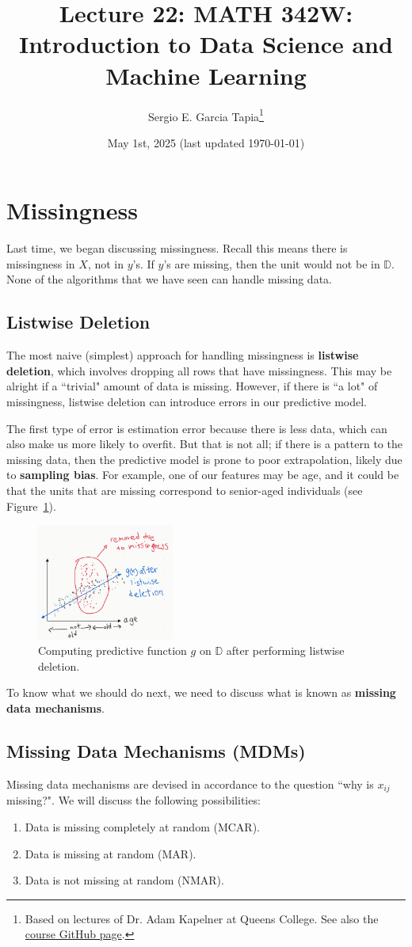 \documentclass[12pt, a4paper]{article}
\title{Lecture 22: MATH 342W: Introduction to Data Science and Machine Learning}
\author{Sergio E. Garcia Tapia\thanks{Based on lectures of Dr. Adam Kapelner at Queens College.
See also the \href{https://github.com/kapelner/QC_MATH_342W_Spring_2025}{course GitHub page}.}}
\date{May 1st, 2025 (last updated \today)}
\theoremstyle{definition}
\begin{document}
	\maketitle
	\section{Missingness}
	Last time, we began discussing missingness. Recall this means there is
	missingness in $X$, not in $y$'s. If $y$'s are missing, then the unit would
	not be in $\mathbb{D}$. None of the algorithms that we have seen can handle
	missing data.
	
	\subsection{Listwise Deletion}
	The most naive (simplest) approach for handling missingness is \textbf{listwise deletion},
	which involves dropping all rows that have missingness. This may be alright if
	a ``trivial" amount of data is missing. However, if there is ``a lot" of missingness,
	listwise deletion can introduce errors in our predictive model.
	
	The first type of error is estimation error because there is less data,
	which can also make us more likely to overfit. But that is not all; if
	there is a pattern to the missing data, then the predictive model is
	prone to poor extrapolation, likely due to \textbf{sampling bias}.
	For example, one of our features may be age, and it could be that the
	units that are missing correspond to senior-aged individuals
	(see Figure~\ref{fig:model-after-listwise-deletion}).
	\begin{figure}
		\centering
		\includegraphics[width=0.4\textwidth]{model-after-listwise-deletion}
		\caption{Computing predictive function $g$ on $\mathbb{D}$ after
		performing listwise deletion.}
		\label{fig:model-after-listwise-deletion}
	\end{figure}
	To know what we should do next, we need to discuss what is known as
	\textbf{missing data mechanisms}.
	\subsection{Missing Data Mechanisms (MDMs)}
	Missing data mechanisms are devised in accordance to the question ``why is $x_{ij}$
	missing?". We will discuss the following possibilities:
	\begin{enumerate}[label=(\arabic*)]
		\item Data is missing completely at random (MCAR).
		\item Data is missing at random (MAR).
		\item Data is not missing at random (NMAR).
	\end{enumerate}
\end{document}

